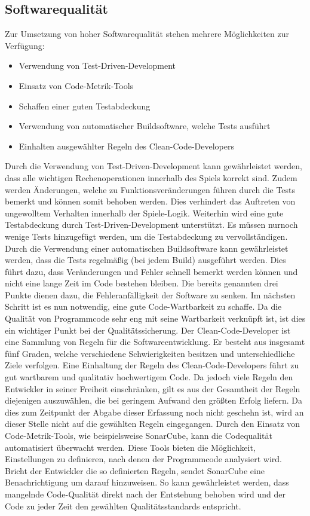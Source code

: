 \subsection{Softwarequalität}
Zur Umsetzung von hoher Softwarequalität stehen mehrere Möglichkeiten zur Verfügung:
\begin{itemize}
	\item{Verwendung von Test-Driven-Development}
	\item{Einsatz von Code-Metrik-Tools}
	\item{Schaffen einer guten Testabdeckung}
	\item{Verwendung von automatischer Buildsoftware, welche Tests ausführt}
	\item{Einhalten ausgewählter Regeln des Clean-Code-Developers}
\end{itemize}
Durch die Verwendung von Test-Driven-Development kann gewährleistet werden, dass alle wichtigen Rechenoperationen innerhalb des Spiels korrekt sind. Zudem werden Änderungen, welche zu Funktionsveränderungen führen durch die Tests bemerkt und können somit behoben werden.
Dies verhindert das Auftreten von ungewolltem Verhalten innerhalb der Spiele-Logik. Weiterhin wird eine gute Testabdeckung durch Test-Driven-Development unterstützt. Es müssen nurnoch wenige Tests hinzugefügt werden, um die Testabdeckung zu vervollständigen.
Durch die Verwendung einer automatischen Buildsoftware kann gewährleistet werden, dass die Tests regelmäßig (bei jedem Build) ausgeführt werden. Dies führt dazu, dass Veränderungen und Fehler schnell bemerkt werden können und nicht eine lange Zeit im Code bestehen bleiben.
Die bereits genannten drei Punkte dienen dazu, die Fehleranfälligkeit der Software zu senken. Im nächsten Schritt ist es nun notwendig, eine gute Code-Wartbarkeit zu schaffe. Da die Qualität von Programmcode sehr eng mit seine Wartbarkeit verknüpft ist, ist dies ein wichtiger Punkt bei der Qualitätssicherung.
Der Clean-Code-Developer ist eine Sammlung von Regeln für die Softwareentwicklung. Er besteht aus insgesamt fünf Graden, welche verschiedene Schwierigkeiten besitzen und unterschiedliche Ziele verfolgen. Eine Einhaltung der Regeln des Clean-Code-Developers führt zu gut wartbarem und qualitativ hochwertigem Code.
Da jedoch viele Regeln den Entwickler in seiner Freiheit einschränken, gilt es aus der Gesamtheit der Regeln diejenigen auszuwählen, die bei geringem Aufwand den größten Erfolg liefern. Da dies zum Zeitpunkt der Abgabe dieser Erfassung noch nicht geschehn ist, wird an dieser Stelle nicht auf die gewählten Regeln eingegangen.
Durch den Einsatz von Code-Metrik-Tools, wie beispielsweise SonarCube, kann die Codequalität automatisiert überwacht werden. Diese Tools bieten die Möglichkeit, Einstellungen zu definieren, nach denen der Programmcode analysiert wird.
Bricht der Entwickler die so definierten Regeln, sendet SonarCube eine Benachrichtigung um darauf hinzuweisen. So kann gewährleistet werden, dass mangelnde Code-Qualität direkt nach der Entstehung behoben wird und der Code zu jeder Zeit den gewählten Qualitätsstandards entspricht.
